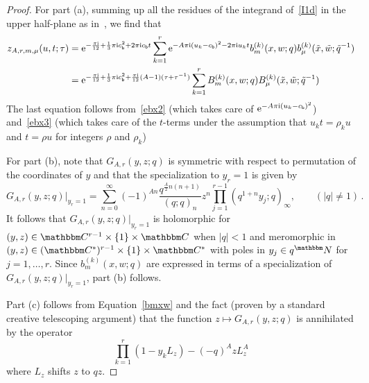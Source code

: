 \documentclass[12pt,reqno]{amsart}
\theoremstyle{definition}
\def\BN{\mathbbm N}
\def\BC{\mathbbm C}
\def\tq{\tilde{q}}
\def\tx{\tilde{x}}
\def\tw{\tilde{w}}
\def\bb{\mathsf{b}}
\def\ri{\mathrm{i}}
\def\tx{\tilde{x}}
\def\re{{\rm e}}
\def\ri{{\rm i}}
\begin{document}
\begin{proof}
  For part (a), summing up all the residues of the integrand
  of~\eqref{I1d} in the upper half-plane as in~\cite{GK:qseries}, we
  find that 
\begin{align}
  \label{eq:Ira-fac}
  z_{A,r,m,\mu}(u,t;\tau)
  &=
    \re^{-\frac{\pi\ri}{12} +\frac{1}{3}\pi\ri c_\bb^2+2\pi\ri c_\bb t}
    \sum_{k=1}^r \re^{-A\pi\ri(u_k-c_\bb)^2-2\pi\ri u_k t} 
    b^{(k)}_{m}(x,w;q) b^{(k)}_{\mu}(\tx,\tw;\tq^{-1}) \\
    \label{eq:Ira-fac2}
  &=
    \re^{-\frac{\pi\ri}{12}+\frac{1}{3}\pi\ri c_\bb^2+\frac{\pi\ri}{12}(A-1)(\tau+\tau^{-1})}
    \sum_{k=1}^r B^{(k)}_{m}(x,w;q) B^{(k)}_{\mu}(\tx,\tw;\tq^{-1})
  \end{align}
  The last equation follows from~\eqref{ebx2} (which takes care of
  $\re^{-A \pi \ri (u_k-c_\bb)^2}$) and~\eqref{ebx3} (which takes
  care of the $t$-terms under the assumption that $u_k t = \rho_k u$
  and $t = \rho u$ for integers $\rho$ and $\rho_k$) 

  For part (b), note that $G_{A,r}(y,z;q)$ is symmetric with respect
  to permutation of the coordinates of $y$ and that the specialization
  to $y_r=1$ is given by
\begin{equation}
\label{Garr}
 G_{A,r}(y,z;q)|_{y_r=1} 
    = \sum_{n=0}^\infty
    (-1)^{An} \frac{q^{\frac{A}{2}n(n+1)}}{(q;q)_n} z^n
    \prod_{j=1}^{r-1}(q^{1+n}y_j;q)_\infty, \qquad (|q| \neq 1)\,.
\end{equation}
It follows that $G_{A,r}(y,z;q)|_{y_r=1}$ is holomorphic for $(y,z) \in
\BC^{r-1} \times \{1\} \times \BC$ when $|q|<1$ and meromorphic in
$(y,z) \in (\BC^*)^{r-1} \times \{1\} \times \BC^*$ with
poles in $y_j \in q^\BN$ for $j=1,\dots,r$. Since $b^{(k)}_m(x,w;q)$
are expressed in terms of a specialization of $G_{A,r}(y,z;q)|_{y_r=1}$,
part (b) follows. 

  Part (c) follows from Equation~\eqref{bmxw} and the fact (proven
  by a standard creative telescoping argument) that the function
  $z \mapsto G_{A,r}(y,z;q)$ is annihilated by the operator
  \begin{equation}
  \label{Gzrec}
  \prod_{k=1}^r (1-y_k L_z) - (-q)^A z L_z^A 
  \end{equation}
  where $L_z$ shifts $z$ to $q z$.
\end{proof}



%

\end{document}
